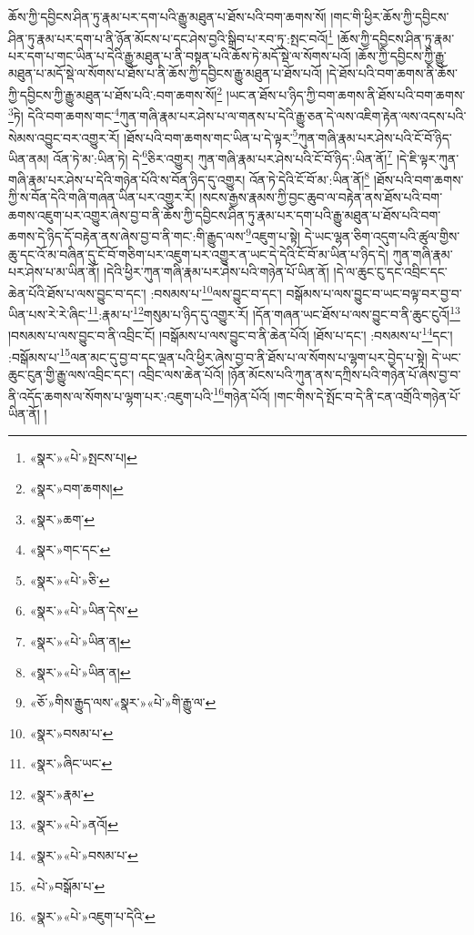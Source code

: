 ཆོས་ཀྱི་དབྱིངས་ཤིན་ཏུ་རྣམ་པར་དག་པའི་རྒྱུ་མཐུན་པ་ཐོས་པའི་བག་ཆགས་སོ། །གང་གི་ཕྱིར་ཆོས་ཀྱི་དབྱིངས་ཤིན་ཏུ་རྣམ་པར་དག་པ་ནི་ཉོན་མོངས་པ་དང་ཤེས་བྱའི་སྒྲིབ་པ་རབ་ཏུ་:སྤང་བའོ།\footnote{«སྣར་»«པེ་»སྤངས་པ།} །ཆོས་ཀྱི་དབྱིངས་ཤིན་ཏུ་རྣམ་པར་དག་པ་གང་ཡིན་པ་དེའི་རྒྱུ་མཐུན་པ་ནི་བསྟན་པའི་ཆོས་ཏེ་མདོ་སྡེ་ལ་སོགས་པའོ། །ཆོས་ཀྱི་དབྱིངས་ཀྱི་རྒྱུ་མཐུན་པ་མདོ་སྡེ་ལ་སོགས་པ་ཐོས་པ་ནི་ཆོས་ཀྱི་དབྱིངས་རྒྱུ་མཐུན་པ་ཐོས་པའོ། །དེ་ཐོས་པའི་བག་ཆགས་ནི་ཆོས་ཀྱི་དབྱིངས་ཀྱི་རྒྱུ་མཐུན་པ་ཐོས་པའི་:བག་ཆགས་སོ།\footnote{«སྣར་»བག་ཆགས།} །ཡང་ན་ཐོས་པ་ཉིད་ཀྱི་བག་ཆགས་ནི་ཐོས་པའི་བག་ཆགས་\footnote{«སྣར་»ཆག་}ཏེ། དེའི་བག་ཆགས་གང་\footnote{«སྣར་»གང་དང་}ཀུན་གཞི་རྣམ་པར་ཤེས་པ་ལ་གནས་པ་དེའི་རྒྱུ་ཅན་དེ་ལས་འཇིག་རྟེན་ལས་འདས་པའི་སེམས་འབྱུང་བར་འགྱུར་རོ། །ཐོས་པའི་བག་ཆགས་གང་ཡིན་པ་དེ་ལྟར་\footnote{«སྣར་»«པེ་»ཅི་}ཀུན་གཞི་རྣམ་པར་ཤེས་པའི་ངོ་བོ་ཉིད་ཡིན་ནམ། འོན་ཏེ་མ་:ཡིན་ཏེ། དེ་\footnote{«སྣར་»«པེ་»ཡིན་དེས་}ཅིར་འགྱུར། ཀུན་གཞི་རྣམ་པར་ཤེས་པའི་ངོ་བོ་ཉིད་:ཡིན་ནོ།\footnote{«སྣར་»«པེ་»ཡིན་ན།} །དེ་ཇི་ལྟར་ཀུན་གཞི་རྣམ་པར་ཤེས་པ་དེའི་གཉེན་པོའི་ས་བོན་ཉིད་དུ་འགྱུར། འོན་ཏེ་དེའི་ངོ་བོ་མ་:ཡིན་ནོ།\footnote{«སྣར་»«པེ་»ཡིན་ན།} །ཐོས་པའི་བག་ཆགས་ཀྱི་ས་བོན་དེའི་གཞི་གཞན་ཡིན་པར་འགྱུར་རོ། །སངས་རྒྱས་རྣམས་ཀྱི་བྱང་ཆུབ་ལ་བརྟེན་ནས་ཐོས་པའི་བག་ཆགས་འཇུག་པར་འགྱུར་ཞེས་བྱ་བ་ནི་ཆོས་ཀྱི་དབྱིངས་ཤིན་ཏུ་རྣམ་པར་དག་པའི་རྒྱུ་མཐུན་པ་ཐོས་པའི་བག་ཆགས་དེ་ཉིད་དོ་བརྟེན་ནས་ཞེས་བྱ་བ་ནི་གང་:གི་རྒྱུད་ལས་\footnote{«ཅོ་»གིས་རྒྱུད་ལས་«སྣར་»«པེ་»གི་རྒྱུ་ལ་}འཇུག་པ་སྟེ། དེ་ཡང་ལྷན་ཅིག་འདུག་པའི་ཚུལ་གྱིས་ཆུ་དང་འོ་མ་བཞིན་དུ་ངོ་བོ་གཅིག་པར་འཇུག་པར་འགྱུར་ན་ཡང་དེ་དེའི་ངོ་བོ་མ་ཡིན་པ་ཉིད་དེ། ཀུན་གཞི་རྣམ་པར་ཤེས་པ་མ་ཡིན་ནོ། །དེའི་ཕྱིར་ཀུན་གཞི་རྣམ་པར་ཤེས་པའི་གཉེན་པོ་ཡིན་ནོ། །དེ་ལ་ཆུང་ངུ་དང་འབྲིང་དང་ཆེན་པོའི་ཐོས་པ་ལས་བྱུང་བ་དང་། :བསམས་པ་\footnote{«སྣར་»བསམ་པ་}ལས་བྱུང་བ་དང་། བསྒོམས་པ་ལས་བྱུང་བ་ཡང་བལྟ་བར་བྱ་བ་ཡིན་པས་རེ་རེ་ཞིང་\footnote{«སྣར་»ཞིང་ཡང་}:རྣམ་པ་\footnote{«སྣར་»རྣམ་}གསུམ་པ་ཉིད་དུ་འགྱུར་རོ། །དོན་གཞན་ཡང་ཐོས་པ་ལས་བྱུང་བ་ནི་ཆུང་ངུའོ།\footnote{«སྣར་»«པེ་»ནའོ།} །བསམས་པ་ལས་བྱུང་བ་ནི་འབྲིང་ངོ། །བསྒོམས་པ་ལས་བྱུང་བ་ནི་ཆེན་པོའོ། །ཐོས་པ་དང་། :བསམས་པ་\footnote{«སྣར་»«པེ་»བསམ་པ་}དང་། :བསྒོམས་པ་\footnote{«པེ་»བསྒོམ་པ་}ལན་མང་དུ་བྱ་བ་དང་ལྡན་པའི་ཕྱིར་ཞེས་བྱ་བ་ནི་ཐོས་པ་ལ་སོགས་པ་ལྷག་པར་བྱེད་པ་སྟེ། དེ་ཡང་ཆུང་ངུན་གྱི་རྒྱུ་ལས་འབྲིང་དང་། འབྲིང་ལས་ཆེན་པོའོ། །ཉོན་མོངས་པའི་ཀུན་ནས་དཀྲིས་པའི་གཉེན་པོ་ཞེས་བྱ་བ་ནི་འདོད་ཆགས་ལ་སོགས་པ་ལྷག་པར་:འཇུག་པའི་\footnote{«སྣར་»«པེ་»འཇུག་པ་དེའི་}གཉེན་པོའོ། །གང་གིས་དེ་སྤོང་བ་དེ་ནི་ངན་འགྲོའི་གཉེན་པོ་ཡིན་ནོ། །
